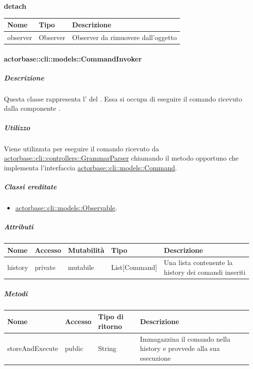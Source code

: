 \documentclass{scalatekids-article}
\begin{document}
\begin{center}
  \textbf{detach}
\end{center}
\begin{tabular}{| p{3cm} | p{3.5cm} | p{8.5cm} |}
  \hline
  Nome & Tipo & Descrizione\\
  \hline
  observer & Observer & Observer da rimuovere dall'oggetto\\
  \hline
\end{tabular}

\paragraph{actorbase::cli::models::CommandInvoker}
\label{sec:actorbase::cli::models::CommandInvoker}

\subparagraph{Descrizione}

Questa classe rappresenta l' del . Essa
si occupa di eseguire il comando ricevuto dalla componente .

\subparagraph{Utilizzo}

Viene utilizzata per eseguire il comando ricevuto da
\hyperref[sec:actorbase::cli::controllers::GrammarParser]{actorbase::cli::controllers::GrammarParser} chiamando il metodo opportuno che
implementa l'interfaccia \hyperref[sec:actorbase::cli::models::Command]{actorbase::cli::models::Command}.

\subparagraph{Classi ereditate}

\begin{itemize}
\item \hyperref[sec:actorbase::cli::models::Observable]{actorbase::cli::models::Observable}.
\end{itemize}

\subparagraph{Attributi}

\begin{tabular}{| p{2.5cm} | p{1.5cm} | p{2cm} | p{2.5cm} | p{8.5cm} |}
  \hline
  Nome & Accesso & Mutabilità & Tipo & Descrizione\\
  \hline
  history & private & mutabile & List[Command] & Una lista contenente la history dei comandi inseriti\\
  \hline
\end{tabular}

\subparagraph{Metodi}

\begin{tabular}{| l | l | l | l |}
  \hline
  Nome & Accesso & Tipo di ritorno & Descrizione\\
  \hline
  storeAndExecute & public & String & Immagazzina il comando nella history e provvede alla sua esecuzione\\
  \hline
\end{tabular}
\end{document}
